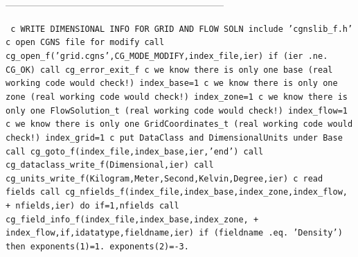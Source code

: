 \documentclass[12pt]{article}
\begin{document}
--------------------------------------------------------------------

{\tt
\noindent c   WRITE DIMENSIONAL INFO FOR GRID AND FLOW SOLN
\newline\indent      include 'cgnslib\_f.h'
\newline c   open CGNS file for modify
\newline\indent      call cg\_open\_f('grid.cgns',CG\_MODE\_MODIFY,index\_file,ier)
\newline\indent      if (ier .ne. CG\_OK) call cg\_error\_exit\_f
\newline c   we know there is only one base (real working code would check!)
\newline\indent      index\_base=1
\newline c   we know there is only one zone (real working code would check!)
\newline\indent      index\_zone=1
\newline c   we know there is only one FlowSolution\_t (real working code would check!)
\newline\indent      index\_flow=1
\newline c   we know there is only one GridCoordinates\_t (real working code would check!)
\newline\indent      index\_grid=1
\newline c   put DataClass and DimensionalUnits under Base
\newline\indent      call cg\_goto\_f(index\_file,index\_base,ier,'end')
\newline\indent      call cg\_dataclass\_write\_f(Dimensional,ier)
\newline\indent      call cg\_units\_write\_f(Kilogram,Meter,Second,Kelvin,Degree,ier)
\newline c   read fields
\newline\indent      call cg\_nfields\_f(index\_file,index\_base,index\_zone,index\_flow,
\newline + \indent  nfields,ier)
\newline\indent      do if=1,nfields
\newline\indent\indent        call cg\_field\_info\_f(index\_file,index\_base,index\_zone,
\newline + \indent\indent   index\_flow,if,idatatype,fieldname,ier)
\newline\indent\indent        if (fieldname .eq. 'Density') then
\newline\indent\indent\indent          exponents(1)=1.
\newline\indent\indent\indent          exponents(2)=-3.
}
\end{document}
